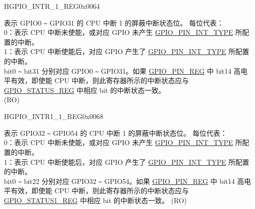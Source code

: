 \begin{register}{H}{GPIO\_INTR\_1\_REG}{0x0064}\label{regdesc:GPIOINTR1REG}
%
\regnewline%
\begin{regdesc}\begin{reglist}
\label{fielddesc:GPIOINT1}\item [GPIO\_INT\_1] 表示 GPIO0 \verb+~+ GPIO31 的 CPU 中断 1 的屏蔽中断状态位。 每位代表：\\
 0：表示 CPU 中断未使能，或对应 GPIO 未产生  \hyperref[fielddesc:GPIOPINNINTTYPE]{GPIO\_PIN\_INT\_TYPE} 所配置的中断。\\
1：表示 CPU 中断使能后，对应 GPIO 产生了  \hyperref[fielddesc:GPIOPINNINTTYPE]{GPIO\_PIN\_INT\_TYPE} 所配置的中断。\\
bit0 \verb+~+ bit31 分别对应 GPIO0 \verb+~+ GPIO31。如果  \hyperref[regdesc:GPIOPINNREG]{GPIO\_PIN\_REG} 中 bit14 高电平有效，即使能 CPU 中断，则此寄存器所示的中断状态应与  \hyperref[regdesc:GPIOSTATUSREG]{GPIO\_STATUS\_REG} 中相应 bit 的中断状态一致。\\
(RO)
\end{reglist}\end{regdesc}
\end{register}


\begin{register}{H}{GPIO\_INTR1\_1\_REG}{0x0068}\label{regdesc:GPIOINTR11REG}
%
%
\regnewline%
\begin{regdesc}\begin{reglist}
\label{fielddesc:GPIOINT11}\item [GPIO\_INT1\_1] 表示 GPIO32 \verb+~+ GPIO54 的 CPU 中断 1 的屏蔽中断状态位。 每位代表：\\
 0：表示 CPU 中断未使能，或对应 GPIO 未产生  \hyperref[fielddesc:GPIOPINNINTTYPE]{GPIO\_PIN\_INT\_TYPE} 所配置的中断。\\
1：表示 CPU 中断使能后，对应 GPIO 产生了  \hyperref[fielddesc:GPIOPINNINTTYPE]{GPIO\_PIN\_INT\_TYPE} 所配置的中断。\\
bit0 \verb+~+ bit22 分别对应 GPIO32 \verb+~+ GPIO54。如果  \hyperref[regdesc:GPIOPINNREG]{GPIO\_PIN\_REG} 中 bit14 高电平有效，即使能 CPU 中断，则此寄存器所示的中断状态应与  \hyperref[regdesc:GPIOSTATUS1REG]{GPIO\_STATUS1\_REG} 中相应 bit 的中断状态一致。
(RO)
\end{reglist}\end{regdesc}
\end{register}


